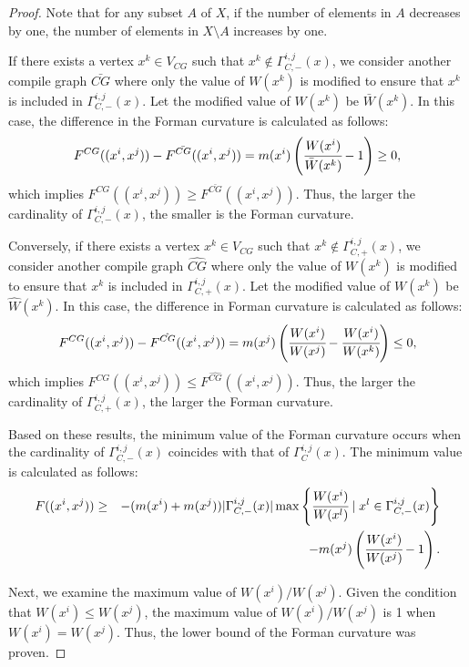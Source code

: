 \documentclass[preprint,12pt,number]{elsarticle}
\theoremstyle{plain} %
\theoremstyle{definition} %
\begin{document}
\begin{proof}
    Note that for any subset $A$ of $X$, if the number of elements in $A$ decreases by one, the number of elements in $X\setminus A$ increases by one.

    If there exists a vertex $x^k \in V_{CG}$ such that $x^k \notin \Gamma_{C,-}^{i,j}(x)$, we consider another compile graph $\bar{CG}$ where only the value of $W(x^k)$ is modified to ensure that $x^k$ is included in $\Gamma_{C,-}^{i,j}(x)$. Let the modified value of $W(x^k)$ be $\bar{W}(x^k)$. In this case, the difference in the Forman curvature is calculated as follows:
    \begin{eqnarray*}
        F^{CG}((x^i,x^j)) - F^{\bar{CG}}((x^i,x^j)) = m(x^i) \left( \cfrac{W(x^i)}{\bar{W}(x^k)} - 1\right) \geq 0,
    \end{eqnarray*}
    which implies $F^{CG}((x^i,x^j)) \geq F^{\bar{CG}}((x^i,x^j))$. Thus, the larger the cardinality of $\Gamma_{C,-}^{i,j}(x)$, the smaller is the Forman curvature.

    Conversely, if there exists a vertex $x^k \in V_{CG}$ such that $x^k \notin \Gamma_{C,+}^{i,j}(x)$, we consider another compile graph $\hat{CG}$ where only the value of $W(x^k)$ is modified to ensure that $x^k$ is included in $\Gamma_{C,+}^{i,j}(x)$. Let the modified value of $W(x^k)$ be $\hat{W}(x^k)$. In this case, the difference in Forman curvature is calculated as follows:
    \begin{eqnarray*}
        F^{CG}((x^i,x^j)) - F^{\hat{CG}}((x^i,x^j)) = m(x^j) \left( \cfrac{W(x^i)}{W(x^j)} - \cfrac{W(x^i)}{W(x^k)}\right) \leq 0,
    \end{eqnarray*}
    which implies $F^{CG}((x^i,x^j)) \leq F^{\hat{CG}}((x^i,x^j))$. Thus, the larger the cardinality of $\Gamma_{C,+}^{i,j}(x)$, the larger  the Forman curvature.

    Based on these results, the minimum value of the Forman curvature occurs when the cardinality of $\Gamma_{C,-}^{i,j}(x)$ coincides with that of $\Gamma_C^{i,j}(x)$. The minimum value is calculated as follows:
    \begin{eqnarray*}
        F((x^i,x^j)) 
        &\geq& -(m(x^i)+m(x^j)) |\Gamma^{i,j}_{C,-} (x)|\max \left\{ \cfrac{W(x^i)}{W(x^l)} \mid x^l \in \Gamma^{i,j}_{C,-}(x)\right\} \nonumber\\
        &\ & - m(x^j)\left(\cfrac{W(x^i)}{W(x^j)} -1 \right).
    \end{eqnarray*}

    Next, we examine the maximum value of $W(x^i)/W(x^j)$. Given the condition that $W(x^i) \leq W(x^j)$, the maximum value of $W(x^i)/W(x^j)$ is 1 when $W(x^i)=W(x^j)$. Thus, the lower bound of the Forman curvature was proven.
\end{proof}
\end{document}
